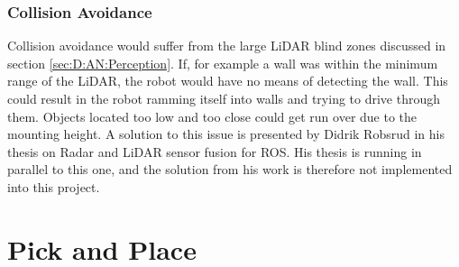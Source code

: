 \subsubsection{Collision Avoidance}
Collision avoidance would suffer from the large LiDAR blind zones discussed in section \ref{sec:D:AN:Perception}. If, for example a wall was within the minimum range of the LiDAR, the robot would have no means of detecting the wall. This could result in the robot ramming itself into walls and trying to drive through them. Objects located too low and too close could get run over due to the mounting height. A solution to this issue is presented by Didrik Robsrud in his thesis on Radar and LiDAR sensor fusion for ROS. His thesis is running in parallel to this one, and the solution from his work is therefore not implemented into this project.




\section{Pick and Place} \label{sec:D:PickAndPlace}
